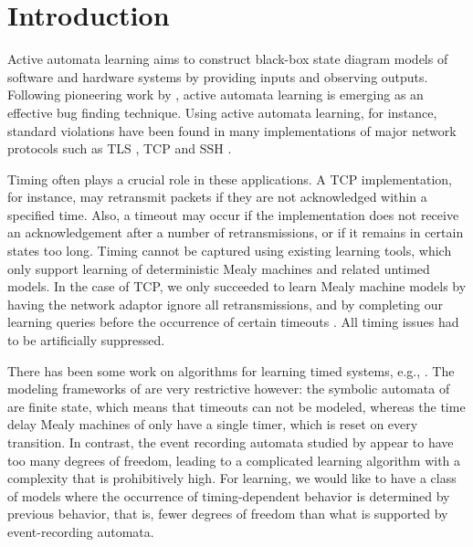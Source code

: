 \section{Introduction}
\label{sec:intro}

Active automata learning aims to construct black-box state diagram models of software and hardware systems
by providing inputs and observing outputs.
Following pioneering work by \cite{Ang87,PeVaYa02,Hagerer2002,RaMeSM2009,IsHoSt2015},
active automata learning is emerging as an effective bug finding technique.
Using active automata learning, for instance, standard violations have been found in many implementations of
major network protocols such as TLS \cite{dRP15}, TCP \cite{FJV16} and SSH \cite{FiterauEtAl17}.

Timing often plays a crucial role in these applications.
A TCP implementation, for instance, may retransmit packets if they are not acknowledged within
a specified time. Also, a timeout may occur if the implementation does not receive an acknowledgement
after a number of retransmissions, or if it remains in certain states too long.
Timing cannot be captured using existing learning tools, which only support learning of deterministic
Mealy machines and related untimed models.
In the case of TCP, we only succeeded to learn Mealy machine models by having the network adaptor ignore all retransmissions,
and by completing our learning queries before the occurrence of certain timeouts \cite{FJV16}.
All timing issues had to be artificially suppressed.

There has been some work on algorithms for learning timed systems, e.g., \cite{GrinchteinJL10,MensM15,CCF16}.
The modeling frameworks of \cite{MensM15,CCF16} are very restrictive however: the symbolic automata of \cite{MensM15}
are finite state, which means that timeouts can not be modeled, whereas the time delay Mealy machines of
\cite{CCF16} only have a single timer, which is reset on every transition.
In contrast, the event recording automata studied by \cite{GrinchteinJL10} appear to have too many degrees of freedom,
leading to a complicated learning algorithm with a complexity that is prohibitively high.
For learning, we would like to have a class of models where the occurrence of timing-dependent behavior
is determined by previous behavior, that is, fewer degrees of freedom than what is supported by event-recording automata.

